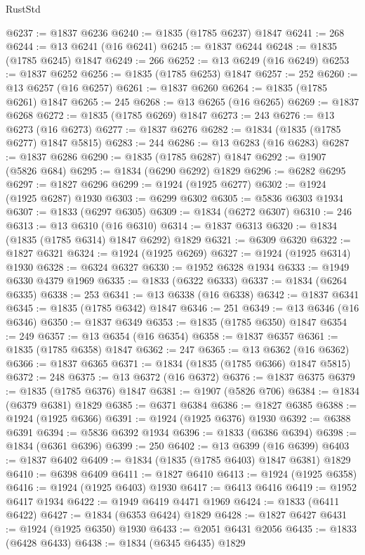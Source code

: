 \begin{lexlean}{RustStd}
\begin{coremodule}
@6237 := @1837 @6236
@6240 := @1835 (@1785 @6237) @1847
@6241 := 268
@6244 := @13 @6241 (@16 @6241)
@6245 := @1837 @6244
@6248 := @1835 (@1785 @6245) @1847
@6249 := 266
@6252 := @13 @6249 (@16 @6249)
@6253 := @1837 @6252
@6256 := @1835 (@1785 @6253) @1847
@6257 := 252
@6260 := @13 @6257 (@16 @6257)
@6261 := @1837 @6260
@6264 := @1835 (@1785 @6261) @1847
@6265 := 245
@6268 := @13 @6265 (@16 @6265)
@6269 := @1837 @6268
@6272 := @1835 (@1785 @6269) @1847
@6273 := 243
@6276 := @13 @6273 (@16 @6273)
@6277 := @1837 @6276
@6282 := @1834 (@1835 (@1785 @6277) @1847 @5815)
@6283 := 244
@6286 := @13 @6283 (@16 @6283)
@6287 := @1837 @6286
@6290 := @1835 (@1785 @6287) @1847
@6292 := @1907 (@5826 @684)
@6295 := @1834 (@6290 @6292) @1829
@6296 := @6282 @6295
@6297 := @1827 @6296
@6299 := @1924 (@1925 @6277)
@6302 := @1924 (@1925 @6287) @1930
@6303 := @6299 @6302
@6305 := @5836 @6303 @1934
@6307 := @1833 (@6297 @6305)
@6309 := @1834 (@6272 @6307)
@6310 := 246
@6313 := @13 @6310 (@16 @6310)
@6314 := @1837 @6313
@6320 := @1834 (@1835 (@1785 @6314) @1847 @6292) @1829
@6321 := @6309 @6320
@6322 := @1827 @6321
@6324 := @1924 (@1925 @6269)
@6327 := @1924 (@1925 @6314) @1930
@6328 := @6324 @6327
@6330 := @1952 @6328 @1934
@6333 := @1949 @6330 @4379 @1969
@6335 := @1833 (@6322 @6333)
@6337 := @1834 (@6264 @6335)
@6338 := 253
@6341 := @13 @6338 (@16 @6338)
@6342 := @1837 @6341
@6345 := @1835 (@1785 @6342) @1847
@6346 := 251
@6349 := @13 @6346 (@16 @6346)
@6350 := @1837 @6349
@6353 := @1835 (@1785 @6350) @1847
@6354 := 249
@6357 := @13 @6354 (@16 @6354)
@6358 := @1837 @6357
@6361 := @1835 (@1785 @6358) @1847
@6362 := 247
@6365 := @13 @6362 (@16 @6362)
@6366 := @1837 @6365
@6371 := @1834 (@1835 (@1785 @6366) @1847 @5815)
@6372 := 248
@6375 := @13 @6372 (@16 @6372)
@6376 := @1837 @6375
@6379 := @1835 (@1785 @6376) @1847
@6381 := @1907 (@5826 @706)
@6384 := @1834 (@6379 @6381) @1829
@6385 := @6371 @6384
@6386 := @1827 @6385
@6388 := @1924 (@1925 @6366)
@6391 := @1924 (@1925 @6376) @1930
@6392 := @6388 @6391
@6394 := @5836 @6392 @1934
@6396 := @1833 (@6386 @6394)
@6398 := @1834 (@6361 @6396)
@6399 := 250
@6402 := @13 @6399 (@16 @6399)
@6403 := @1837 @6402
@6409 := @1834 (@1835 (@1785 @6403) @1847 @6381) @1829
@6410 := @6398 @6409
@6411 := @1827 @6410
@6413 := @1924 (@1925 @6358)
@6416 := @1924 (@1925 @6403) @1930
@6417 := @6413 @6416
@6419 := @1952 @6417 @1934
@6422 := @1949 @6419 @4471 @1969
@6424 := @1833 (@6411 @6422)
@6427 := @1834 (@6353 @6424) @1829
@6428 := @1827 @6427
@6431 := @1924 (@1925 @6350) @1930
@6433 := @2051 @6431 @2056
@6435 := @1833 (@6428 @6433)
@6438 := @1834 (@6345 @6435) @1829

\end{coremodule}
\end{lexlean}
